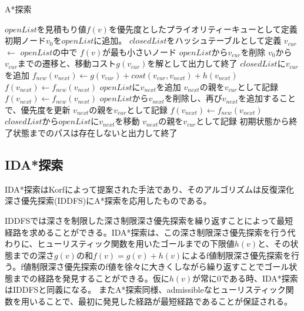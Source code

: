 \documentclass[a4paper,11pt,oneside,openany]{jsbook}
\begin{document}
\begin{algorithm}
\caption{A*探索}
\label{alg:pbnf}
\begin{algorithmic}[1]
\State $openList$を見積もり値$f(v)$を優先度としたプライオリティーキューとして定義
\State 初期ノード$v_0$を$openList$に追加。
\State $closedList$をハッシュテーブルとして定義
    \State $v_{cur}$ $\leftarrow$ $openList$の中で $f(v)$が最も小さいノード
    \State $openList$から$v_{cur}$を削除
        \State $v_0$から$v_{cur}$までの遷移と、移動コスト$g(v_{cur})$を解として出力して終了
    \EndIf
    \State $closedList$に$v_{cur}$を追加
        \State $f_{new}(v_{next}) \leftarrow g(v_{cur}) + cost(v_{cur}, v_{next}) + h(v_{next})$
            \State $f(v_{next}) \leftarrow f_{new}(v_{next})$ 
            \State $openList$に$v_{next}$を追加
            \State $v_{next}$の親を$v_{cur}$として記録
        \EndIf
            \State $f(v_{next}) \leftarrow f_{new}(v_{next})$
            \State $openList$から$v_{next}$を削除し、再び$v_{next}$を追加することで、優先度を更新
            \State $v_{next}$の親を$v_{cur}$として記録
        \EndIf
            \State $f(v_{next}) \leftarrow f_{new}(v_{next})$
            \State $closedList$から$openList$に$v_{next}$を移動
            \State $v_{next}$の親を$v_{cur}$として記録
        \EndIf
    \EndFor
\EndWhile
\State 初期状態から終了状態までのパスは存在しないと出力して終了
\end{algorithmic}
\end{algorithm}
\newpage

\subsection{IDA*探索}
IDA*探索\cite{Kor85}はKorfによって提案された手法であり、そのアルゴリズムは反復深化深さ優先探索(IDDFS)にA*探索を応用したものである。

IDDFSでは深さを制限した深さ制限深さ優先探索を繰り返すことによって最短経路を求めることができる。IDA*探索は、この深さ制限深さ優先探索を行う代わりに、ヒューリスティック関数を用いたゴールまでの下限値$h(v)$と、その状態までの深さ$g(v)$の和$f(v) = g(v) + h(v)$によるf値制限深さ優先探索を行う。f値制限深さ優先探索のf値を徐々に大きくしながら繰り返すことでゴール状態までの経路を発見することができる。仮に$h(v)$が常に0である時、IDA*探索はIDDFSと同義になる。
またA*探索同様、admissibleなヒューリスティック関数を用いることで、最初に発見した経路が最短経路であることが保証される。
\end{document}
